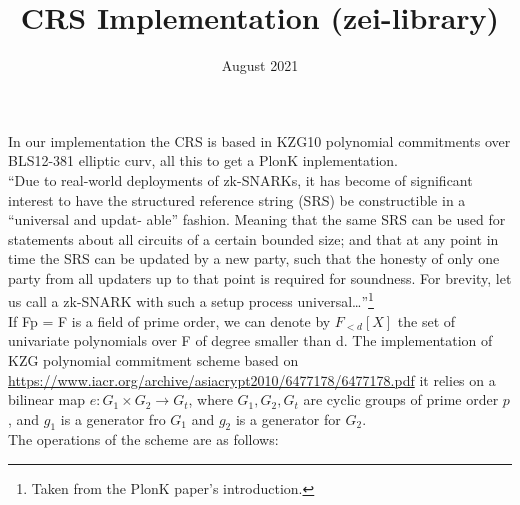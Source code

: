 \documentclass{article}
\title{CRS Implementation (zei-library)}
\date{August 2021}
\begin{document}
\maketitle


\vspace{1cm}

In our implementation the CRS is based in KZG10 polynomial commitments over  BLS12-381 elliptic curv, all this to get a PlonK inplementation.\\


“Due to real-world deployments of zk-SNARKs, it has become of significant interest to have the structured reference string (SRS) be constructible in a “universal and updat- able” fashion. Meaning that the same SRS can be used for statements about all circuits of a certain bounded size; and that at any point in time the SRS can be updated by a new party, such that the honesty of only one party from all updaters up to that point is required for soundness. For brevity, let us call a zk-SNARK with such a setup process universal…”\footnote{Taken from the PlonK paper's introduction.}\\


If Fp = F is a field of prime order, we can denote by $F_{<d}[X]$ the set of univariate polynomials over F of degree smaller than d. The implementation of KZG polynomial commitment scheme based on \url{https://www.iacr.org/archive/asiacrypt2010/6477178/6477178.pdf} it relies on a bilinear map $e:G_1 \times G_2 \longrightarrow G_t$, where $G_1,G_2,G_t$ are cyclic groups of prime order $p$, and $g_1$ is a generator fro $G_1$ and $g_2$ is a generator for $G_2$.\\

The operations of the scheme are as follows:\\
\end{document}
